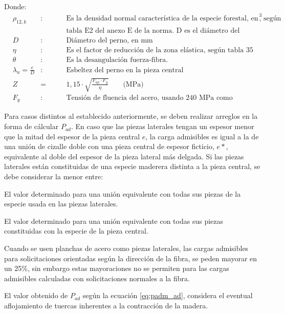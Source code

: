 Donde:
\begin{align*}
&\rho_{12,k} &: \qquad &\text{Es la densidad normal característica de la especie forestal, en kg/m}^3 \text{, según}\\
& & & \text{tabla E2 del anexo E de la norma. D es el diámetro del perno, en mm.}\\
&D &: \qquad &\text{Diámetro del perno, en mm}\\
&\eta &: \qquad &\text{Es el factor de reducción de la zona elástica, según tabla 35 de la norma.}\\
&\theta &: \qquad &\text{Es la desangulación fuerza-fibra.}\\
&\lambda_u = \frac{e}{D} &: \qquad &\text{Esbeltez del perno en la pieza central}\\
&Z &= \qquad &1,15\cdot \sqrt{\frac{F_{ap} \cdot F_y}{\eta}} \qquad \text{(MPa)}\\
&F_y &: \qquad &\text{Tensión de fluencia del acero, usando 240 MPa como referencia} 
\end{align*}

Para casos distintos al establecido anteriormente, se deben realizar arreglos en la forma de cálcular $P_{ad}$. En caso que las piezas laterales tengan un espesor menor que la mitad del espesor de la pieza central $e$, la carga admisibles es igual a la de una unión de cizalle doble con una pieza central de espesor ficticio, $e*$, equivalente al doble del espesor de la pieza lateral más delgada. Si las piezas laterales están constituidas de una especie maderera distinta a la pieza central, se debe considerar la menor entre:
\begin{itemize*}
	\item El valor determinado para una unión equivalente con todas sus piezas de la especie usada en las piezas laterales.
	\item El valor determinado para una unión equivalente con todas sus piezas constituidas con la especie de la pieza central.
\end{itemize*}

Cuando se usen planchas de acero como piezas laterales, las cargas admisibles para solicitaciones orientadas según la dirección de la fibra, se peden mayorar en un 25\%, sin embargo estas mayoraciones no se permiten para las cargas admisibles calculadas con solicitaciones normales a la fibra.

El valor obtenido de $P_{ad}$ según la ecuación \ref{eq:padm_ad}, considera el eventual aflojamiento de tuercas inherentes a la contracción de la madera.

